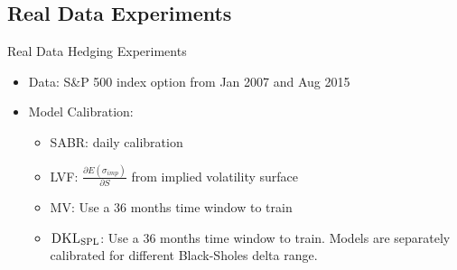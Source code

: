 \documentclass[10pt,table,mathserif]{beamer}
\newcommand{\DKLs}{\bf\textsc{DKL}_{\text{SPL}}}
\begin{document}
\subsection{Real Data Experiments}
\begin{frame}{Real Data  Hedging Experiments}
\begin{itemize}
  \item Data: S\&P 500 index option from Jan 2007 and Aug 2015
  \item Model Calibration:
    \begin{itemize}
      \item SABR: daily calibration
      \item LVF: $\frac{\partial E(\sigma_{imp})}{ \partial S}$ from implied volatility surface
      \item MV: Use a 36 months time window to train
      \item $\DKLs$: Use a 36 months time window to train. Models are separately calibrated for different Black-Sholes delta range.
    \end{itemize}
  \end{itemize}
\end{frame}
\end{document}
